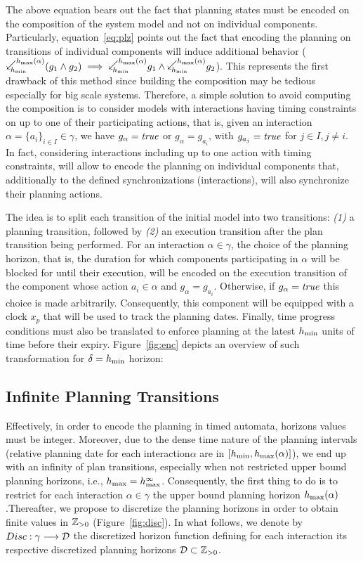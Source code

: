 The above equation bears out the fact that planning states must be encoded on the composition
of the system model and not on individual components. Particularly, equation~\ref{eq:plz}
points out the fact that encoding the planning on transitions of individual components
will induce additional behavior ($\backwardp{\hmin}{\hmx}(g_1\wedge g_2) \implies
\backwardp{\hmin}{\hmx} g_1\wedge\backwardp{\hmin}{\hmx}g_2$). This represents the first 
drawback of
this method since building the composition may be tedious especially for big scale systems.
Therefore, a simple solution to avoid computing the composition is to consider
models with interactions having timing constraints on up to one of their participating
actions, that is, given an interaction $\alpha=\{a_i\}_{i\in I}\in\gamma$, we have
$g_{\alpha}=\textnormal{\textit{true}}$ or $g_{\alpha}=g_{a_i}$, with $g_{a_j}=\textnormal{\textit{true}}$ for $j\in I, j\neq i$.
In fact, considering interactions including up to one action with timing constraints, 
will allow to encode the planning on individual components that, additionally to the defined 
synchronizations (interactions), will also synchronize their planning actions. 

The idea is to split each transition of the initial model into two transitions:
\emph{(1)} a planning transition, followed by \emph{(2)} an execution transition
after the plan transition being performed. For an interaction $\alpha\in\gamma$, the choice
of the planning horizon, that is, the duration for which components participating in $\alpha$ 
will be blocked for until their execution, will be encoded on the execution transition of 
the component whose action $a_i\in\alpha$ and $g_{\alpha}=g_{a_i}$. Otherwise,
if $g_{\alpha}=\textnormal{\textit{true}}$ this choice is made arbitrarily. Consequently, this component will be 
equipped with a clock $x_p$ that will be used to track the planning dates. 
Finally, time progress conditions must also be translated to enforce planning
at the latest $h_{\min}$ units of time before their expiry.
Figure~\ref{fig:enc} depicts an overview of such transformation for $\delta=h_{\min}$ horizon: 


\subsection{Infinite Planning Transitions} 

Effectively, in order to encode the planning in timed automata, horizons values must
be integer. Moreover, due to the dense time nature of the planning intervals (relative 
planning date for each interaction$\alpha$ are in $[h_{\min},h_{\max}(\alpha)]$), we end up with 
an infinity of plan transitions, especially when not restricted upper bound planning horizons, 
i.e., $h_{\max}=h_{\max}^{\infty}$.
Consequently, the first thing to do is to restrict for each interaction $\alpha\in\gamma$ the
upper bound planning horizon $h_{\max}(\alpha)$.Thereafter, we propose to discretize the 
planning horizons in order to obtain finite values in $\mathbb{Z}_{> 0}$ (Figure~\ref{fig:disc}). 
In what follows, we denote by $Disc:\gamma\longrightarrow\mathcal{D}$ the discretized horizon function 
defining for each interaction its respective discretized planning horizons 
$\mathcal{D}\subset\mathbb{Z}_{> 0}$.

